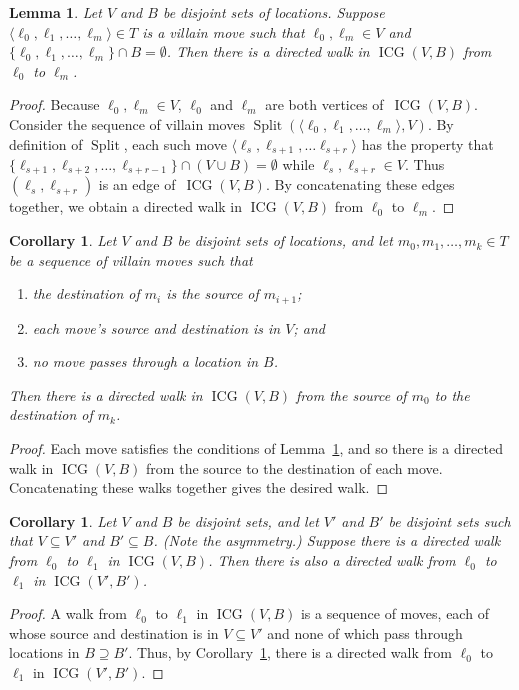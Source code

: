 \documentclass[11pt,letterpaper]{article}
\newcommand{\BreakText}{Split}
\newcommand{\BreakFunc}{\operatorname{\BreakText}}
\newcommand{\Break}[2]{{\BreakFunc({#1}, {#2})}}
\newcommand{\ICG}{\operatorname{ICG}}
\theoremstyle{plain}
\newtheorem{lemma}[theorem]{Lemma}
\newtheorem{corollary}[theorem]{Corollary}
\theoremstyle{definition}
\theoremstyle{remark}
\numberwithin{equation}{section}
\begin{document}
\begin{lemma}
  \label{lem:break-icg}
  Let \(V\) and \(B\) be disjoint sets of locations.
  Suppose \(\langle \ell_0, \ell_1, \ldots, \ell_m \rangle \in T\)
  is a villain move such that
  \(\ell_0,\ell_m \in V\) and
  \(\{\ell_0, \ell_1, \dots, \ell_m\} \cap B = \emptyset\).
  Then there is a directed walk in \(\ICG(V, B)\) from \(\ell_0\) to \(\ell_m\).
\end{lemma}
\begin{proof}
  Because \(\ell_0,\ell_m \in V\),
  \(\ell_0\) and \(\ell_m\) are both vertices of~\(\ICG(V, B)\).
  Consider the sequence of villain moves \(\Break{\langle \ell_0, \ell_1, \ldots, \ell_m \rangle}{V}\).
  By definition of $\BreakFunc$,
  each such move \(\langle \ell_s, \ell_{s+1}, \ldots \ell_{s+r} \rangle\)
  has the property that
  \(\{\ell_{s+1}, \ell_{s+2}, \ldots, \ell_{s+r-1}\} \cap (V \cup B) = \emptyset\)
  while
  \(\ell_s, \ell_{s+r} \in V\).
  Thus \((\ell_s, \ell_{s+r})\) is an edge of~\(\ICG(V, B)\).
  By concatenating these edges together,
  we obtain a directed walk in \(\ICG(V, B)\) from \(\ell_0\) to \(\ell_m\).
\end{proof}
\begin{corollary}
  \label{cor:break-icg-walk}  
  Let \(V\) and \(B\) be disjoint sets of locations,
  and let \(m_0, m_1, \ldots, m_k \in T\) be a sequence of villain moves
  such that
  \begin{enumerate}
  \item the destination of \(m_i\) is the source of \(m_{i+1}\);
  \item each move's source and destination is in \(V\); and
  \item no move passes through a location in \(B\).
  \end{enumerate}
  Then there is a directed walk in \(\ICG(V, B)\) from the source of \(m_0\) to the destination of \(m_k\).
\end{corollary}
\begin{proof}
  Each move satisfies the conditions of Lemma~\ref{lem:break-icg},
  and so there is a directed walk in \(\ICG(V, B)\)
  from the source to the destination of each move.
  Concatenating these walks together gives the desired walk.
\end{proof}
\begin{corollary}
  \label{cor:icg-walk-subset}
  Let \(V\) and \(B\) be disjoint sets,
  and let \(V'\) and \(B'\) be disjoint sets
  such that \(V \subseteq V'\) and \(B' \subseteq B\).
  (Note the asymmetry.)
  Suppose there is a directed walk from \(\ell_0\) to \(\ell_1\) in \(\ICG(V, B)\).
  Then there is also a directed walk from \(\ell_0\) to \(\ell_1\) in \(\ICG(V', B')\).
\end{corollary}
\begin{proof}
  A walk from \(\ell_0\) to \(\ell_1\) in \(\ICG(V, B)\)
  is a sequence of moves, each of whose source and destination is in \(V \subseteq V'\)
  and none of which pass through locations in \(B \supseteq B'\).
  Thus, by Corollary~\ref{cor:break-icg-walk},
  there is a directed walk from \(\ell_0\) to \(\ell_1\) in \(\ICG(V', B')\).
\end{proof}
\end{document}
